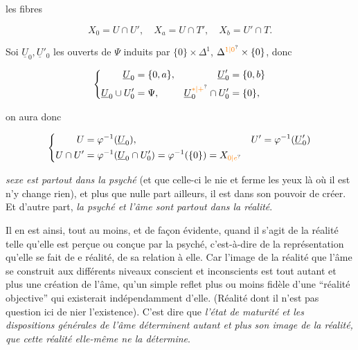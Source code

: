 
les fibres 

\[
 X_0=U\cap U',\quad X_a=U\cap T',\quad X_b=U'\cap T.
\]

Soi $\underline U_0,\underline U'_0$ les ouverts de $\Psi$ induits par $\{0\}\times\Delta^1$, $\Delta^{\unsure{1|0}}\times\{0\}$, donc

\[
 \left\{\begin{aligned}
 \underline U_0&=\{0,a\}, &\underline U'_0&=\{0,b\}\\
 \underline U_0\cup U'_0&=\Psi, &\underline U_0^{\unsure{*|+}}\cap U'_0&=\{0\},
 \end{aligned}\right.
\]

on aura donc

\[
 \left\{\begin{aligned}
 U&=\varphi^{-1}(\underline U_0), & U'&=\varphi^{-1}(\underline U'_0)\\
 U\cap U'&=\varphi^{-1}(\underline U_0\cap U'_0)=\varphi^{-1}(\{0\})=X_{\unsure{0|e}}
 \end{aligned}\right.
\]



\textit{sexe est partout dans la psyché} (et que celle-ci le nie et ferme les yeux là où il est n'y change rien), et plus que nulle part ailleurs, il est dans son pouvoir de créer. Et d'autre part, \textit{la psyché et l'âme sont partout dans la réalité}.

Il en est ainsi, tout au moins, et de façon évidente, quand il s'agit de la réalité telle qu'elle est perçue ou conçue par la psyché, c'est-à-dire de la représentation qu'elle se fait de \margin{\handwritten{$\bullet$}}e réalité, de sa relation à elle. Car l'image de la réalité que l'âme se construit aux différents niveaux conscient et inconscients est tout autant et plus une création de l'âme, qu'un simple reflet plus ou moins fidèle d'une ``réalité objective'' qui existerait indépendamment d'elle. (Réalité dont il n'est pas question ici de nier l'existence). C'est dire que \textit{l'état de maturité et les dispositions générales de l'âme déterminent autant et plus son image de la réalité, que cette réalité elle-même ne la détermine}.

